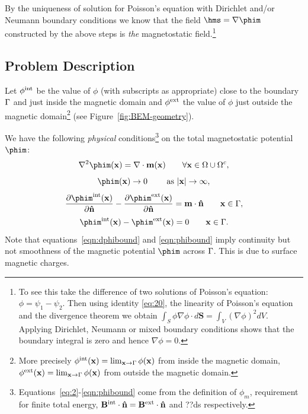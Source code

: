 By the uniqueness of solution for Poisson's equation with Dirichlet and/or Neumann boundary conditions we know that the field $ \hms = \nabla \phim$  constructed by the above steps is \emph{the} magnetostatic field.\footnote{To see this take the difference of two solutions of Poisson's equation: $\phi = \psi_1 - \psi_2$. Then using identity \eqref{eq:20}, the linearity of Poisson's equation and the divergence theorem we obtain $\int_S \phi \nabla \phi \cdot d \mathbf{S} = \int_V (\nabla \phi)^2 dV$. Applying Dirichlet, Neumann or mixed boundary conditions shows that the boundary integral is zero and hence $\nabla \phi = 0$.}

\subsection{Problem Description}
\label{sec:problem-description}
Let $\phi^{\text{int}}$ be the value of $\phi$ (with subscripts as appropriate) close to the boundary ${\Gamma}$ and just inside the magnetic domain  and $\phi^{\text{ext}}$ the value of $\phi$ just outside the magnetic domain\footnote{More precisely $\phi^{\text{int}}(\mathbf{x}) = \lim_{\mathbf{x} \rightarrow {\Gamma}} \phi(\mathbf{x})$ from inside the magnetic domain, $\phi^{\text{ext}}(\mathbf{x}) = \lim_{\mathbf{x} \rightarrow {\Gamma}} \phi(\mathbf{x})$ from outside the magnetic domain.} (see Figure~\ref{fig:BEM-geometry}).

\pagebreak %

We have the following \emph{physical} conditions\footnote{Equations~\eqref{eq:2}-\eqref{eqn:phibound} come from the definition of $\phi_m$, requirement for finite total energy, $\mathbf{B}^\text{int} \cdot \mathbf{\hat{n}} = \mathbf{B}^\text{ext} \cdot \mathbf{\hat{n}}$ and ??ds respectively.} on the total magnetostatic potential $\phim$:
\begin{equation}
  \nabla^2 \phim(\xv) = \nabla \cdot \mv(\xv) \qquad \forall \xv \in \magd \cup \extd,
  \label{eq:2}
\end{equation}
\begin{equation}
  \phim(\xv) \rightarrow 0 \qquad \text{ as } \abs{\xv} \rightarrow \infty,
\end{equation}
\begin{equation}
  \pd{\phim^\inte(\xv)}{\nv} - \pd{\phim^\exte(\xv)}{\nv} = \mv \cdot \nv \qquad \xv \in \boundd,
  \label{eqn:dphibound}
\end{equation}
\begin{equation}
  \phim^\inte(\xv) - \phim^\exte(\xv)  = 0 \qquad \xv \in \boundd.
  \label{eqn:phibound}
\end{equation}
Note that equations~\eqref{eqn:dphibound} and \eqref{eqn:phibound} imply continuity but not smoothness of the magnetic potential $\phim$ across ${\Gamma}$. This is due to surface magnetic charges.


